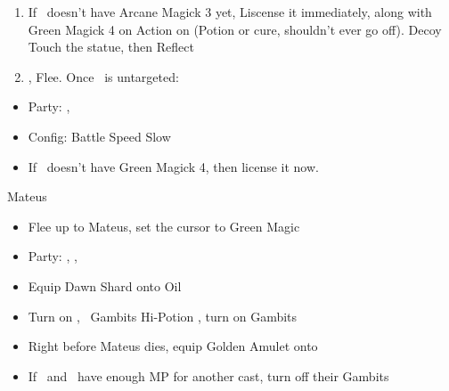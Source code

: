 \begin{enumerate}
	\item If \ashe\ doesn't have Arcane Magick 3 yet, Liscense it immediately, along with Green Magick 4 on \penelo
	\penelof Action on \vaan (Potion or cure, shouldn't ever go off).
	      \ashef Decoy \vaan
	      \vaanf Touch the statue, then Reflect \vaan
\item {}, Flee. Once \vaan\ is untargeted:
\end{enumerate}
\begin{menu}
\begin{itemize}
\item Party: \basch, \balthier
\item Config: Battle Speed Slow
\item If \penelo\ doesn't have Green Magick 4, then license it now.
\end{itemize}
\end{menu}
\begin{battle}{Mateus}
	\begin{itemize}
		\item Flee up to Mateus, set the cursor to Green Magic
		\item Party: \vaan, \ashe, \penelo
		\item Equip Dawn Shard onto \vaan
		      \penelof Oil \penelo
		      	\item Turn on \ashe, \penelo\ Gambits
		      \vaanf Hi-Potion \vaan, turn on Gambits
		      \item Right before Mateus dies, equip Golden Amulet onto \vaan
		      \item If \ashe\ and \penelo\ have enough MP for another cast, turn off their Gambits
	\end{itemize}
\end{battle}